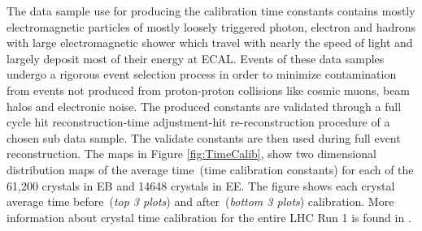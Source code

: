 \newline
The data sample use for producing the calibration time constants contains mostly electromagnetic particles of mostly loosely triggered photon, electron and hadrons with large electromagnetic shower which travel with nearly the speed of light and largely deposit  most of their energy at ECAL. Events of these data samples undergo a rigorous event selection process in order to minimize contamination from events not produced from proton-proton collisions like cosmic muons, beam halos and electronic noise. The produced constants are validated through a full cycle hit reconstruction-time adjustment-hit re-reconstruction procedure of a chosen sub data sample. The validate constants are then used during full event reconstruction.
The maps in Figure \ref{fig:TimeCalib}, show two dimensional distribution maps of the average time~(time calibration constants) for each of the 61,200 crystals in EB and 14648 crystals in EE. The figure shows each crystal average time before~(\textit{top 3 plots}) and after~(\textit{bottom 3 plots}) calibration. More information about crystal time calibration for the entire LHC Run 1 is found in \cite{ECALCAL}.
